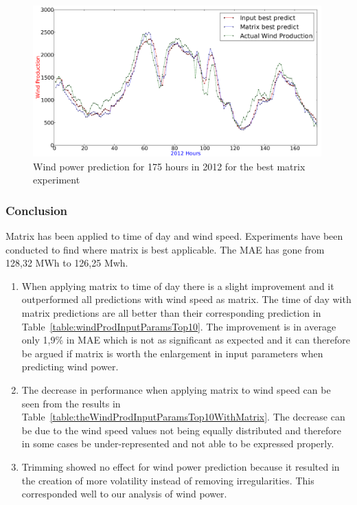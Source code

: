 \begin{figure}[H]
\centering
\includegraphics[width=0.99\textwidth]{billeder/bestMatrixGraph.png}
\caption{Wind power prediction for 175 hours in 2012 for the best matrix experiment}
\label{fig:bestMatrixGraph}
\end{figure}   

\subsubsection{Conclusion}
Matrix has been applied to time of day and wind speed. Experiments have been conducted to find where matrix is best applicable. The MAE has gone from 128,32 MWh to 126,25 Mwh.

\begin{enumerate}
\item When applying matrix to time of day there is a slight improvement and it outperformed all predictions with wind speed as matrix. The time of day with matrix predictions are all better than their corresponding prediction in Table~\ref{table:windProdInputParamsTop10}. The improvement is in average only 1,9\% in MAE which is not as significant as expected and it can therefore be argued if matrix is worth the enlargement in input parameters when predicting wind power.
\item The decrease in performance when applying matrix to wind speed can be seen from the results in Table~\ref{table:theWindProdInputParamsTop10WithMatrix}. The decrease can be due to the wind speed values not being equally distributed and therefore in some cases be under-represented and not able to be expressed properly. 
\item Trimming showed no effect for wind power prediction because it resulted in the creation of more volatility instead of removing irregularities. This corresponded well to our analysis of wind power. 
\end{enumerate}

